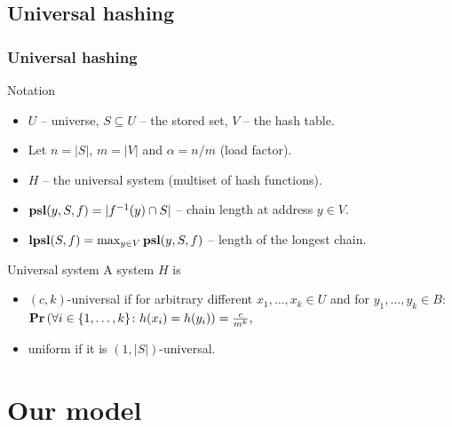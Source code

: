 \subsection{Universal hashing}
\begin{frame}
	\frametitle{Universal hashing}
	
	\begin{block}{Notation}
		\begin{itemize}
			\item $U$ -- universe, $S \subseteq U$ -- the stored set, $V$ -- the hash table.
			\item Let $n = |S|$, $m = |V|$ and $\alpha = n / m$ (load factor).
			\item $H$ -- the universal system (multiset of hash functions).
			\item $\mathbf{psl}(y, S, f) = |f^{-1}(y) \cap S|$ -- chain length at address $y \in V$.
			\item $\mathbf{lpsl}(S, f) = \max_{y \in V} \mathbf{psl}(y, S, f)$ -- length of the longest chain.
		\end{itemize}
	\end{block}
	
	\begin{block}{Universal system}
		A system $H$ is
		\begin{itemize}
			\item $(c, k)$-universal if for arbitrary different $x_1, \dots, x_k \in U$ and for $y_1, \dots, y_k \in B$: $\mathbf{Pr}\left(\forall i \in \{1, \dots, k\}\colon h(x_i) = h(y_i)\right) = \frac{c}{m^k},$
			\item uniform if it is $(1, |S|)$-universal.
		\end{itemize}
	\end{block}
\end{frame}

\section{Our model}

